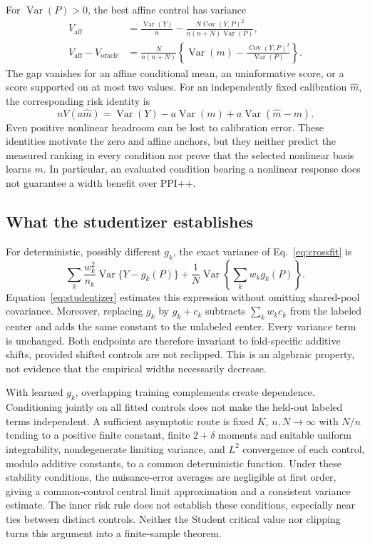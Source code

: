 \documentclass{article}
\newcommand{\Var}{\operatorname{Var}}
\newcommand{\Cov}{\operatorname{Cov}}
\begin{document}
For $\Var(P)>0$, the best affine control has variance
\begin{align}
 V_{\mathrm{aff}}&=\frac{\Var(Y)}n-
 \frac{N\Cov(Y,P)^2}{n(n+N)\Var(P)},\\
 V_{\mathrm{aff}}-V_{\mathrm{oracle}}
 &=\frac{N}{n(n+N)}\left\{\Var(m)-\frac{\Cov(Y,P)^2}{\Var(P)}\right\}.\label{eq:headroom}
\end{align}
The gap vanishes for an affine conditional mean, an uninformative score, or a score supported on at most two values. For an independently fixed calibration $\widehat m$, the corresponding risk identity is
\begin{equation}
 nV(a\widehat m)=\Var(Y)-a\Var(m)+a\Var(\widehat m-m).
 \label{eq:calibration}
\end{equation}
Even positive nonlinear headroom can be lost to calibration error. These identities motivate the zero and affine anchors, but they neither predict the measured ranking in every condition nor prove that the selected nonlinear basis learns $m$. In particular, an evaluated condition bearing a nonlinear response does not guarantee a width benefit over PPI++.

\subsection{What the studentizer establishes}
For deterministic, possibly different $g_k$, the exact variance of Eq.~\eqref{eq:crossfit} is
\begin{equation}
 \sum_k\frac{w_k^2}{n_k}\Var\{Y-g_k(P)\}
  +\frac1N\Var\!\left\{\sum_k w_kg_k(P)\right\}.
 \label{eq:fixedfold}
\end{equation}
Equation~\eqref{eq:studentizer} estimates this expression without omitting shared-pool covariance. Moreover, replacing $g_k$ by $g_k+c_k$ subtracts $\sum_kw_kc_k$ from the labeled center and adds the same constant to the unlabeled center. Every variance term is unchanged. Both endpoints are therefore invariant to fold-specific additive shifts, provided shifted controls are not reclipped. This is an algebraic property, not evidence that the empirical widths necessarily decrease.

With learned $g_k$, overlapping training complements create dependence. Conditioning jointly on all fitted controls does not make the held-out labeled terms independent. A sufficient asymptotic route is fixed $K$, $n,N\to\infty$ with $N/n$ tending to a positive finite constant, finite $2+\delta$ moments and suitable uniform integrability, nondegenerate limiting variance, and $L^2$ convergence of each control, modulo additive constants, to a common deterministic function. Under these stability conditions, the nuisance-error averages are negligible at first order, giving a common-control central limit approximation and a consistent variance estimate. The inner risk rule does not establish these conditions, especially near ties between distinct controls. Neither the Student critical value nor clipping turns this argument into a finite-sample theorem.
\end{document}

